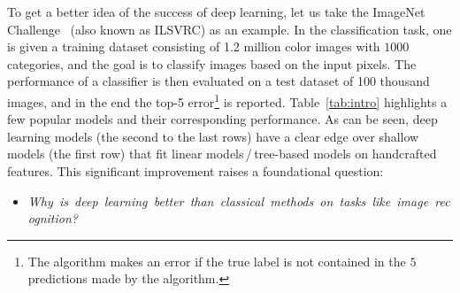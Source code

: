 To get a better idea of the success of deep learning, let us take the ImageNet Challenge~\citep{ILSVRC15} (also known as ILSVRC) as an example. In the classification task, one is given a training dataset consisting of 1.2 million color images with $1000$ categories, and the goal is to classify images based on the input pixels. The performance of a classifier is then evaluated on a test dataset of 100 thousand images, and in the end the top-5 error\footnote{The algorithm makes an error if the true label is not contained in the $5$ predictions made by the algorithm.} is reported. Table~\ref{tab:intro} highlights a few popular models and their corresponding performance. As can be seen, deep learning models (the second to the last rows) have a clear edge over shallow models (the first row) that fit linear models$\,$/$\,$tree-based models on handcrafted features. This significant improvement raises a foundational question:

\begin{itemize}
\centering
\item[] \mbox{\emph{Why is deep learning better than classical methods on tasks like image recognition?}}
\end{itemize}













